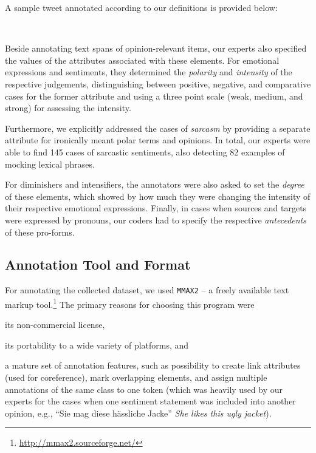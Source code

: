 \noindent{}A sample tweet annotated according to our definitions is
provided below:

{
  \renewcommand{\thesection}{\arabic{section}}
  \begin{example}
    \upshape{}\\[0.8em]
    \noindent{}
  \end{example}
}

Beside annotating text spans of opinion-relevant items, our experts
also specified the values of the attributes associated with these
elements. For emotional expressions and sentiments, they determined
the \emph{polarity} and \emph{intensity} of the respective judgements,
distinguishing between positive, negative, and comparative cases for
the former attribute and using a three point scale (weak, medium, and
strong) for assessing the intensity.

Furthermore, we explicitly addressed the cases of \emph{sarcasm} by
providing a separate attribute for ironically meant polar terms and
opinions.  In total, our experts were able to find 145 cases of
sarcastic sentiments, also detecting 82 examples of mocking lexical
phrases.

For diminishers and intensifiers, the annotators were also asked to
set the \emph{degree} of these elements, which showed by how much they
were changing the intensity of their respective emotional expressions.
Finally, in cases when sources and targets were expressed by pronouns,
our coders had to specify the respective \emph{antecedents} of these
pro-forms.

\subsection{Annotation Tool and Format}\label{subsec:snt:tformat}

For annotating the collected dataset, we used \texttt{MMAX2} -- a
freely available text markup
tool.\footnote{\url{http://mmax2.sourceforge.net/}} The
primary reasons for choosing this program were
\begin{inparaenum}
 \item its non-commercial license,
 \item its portability to a wide variety of platforms, and
 \item a mature set of annotation features, such as possibility to
   create link attributes (used for coreference), mark overlapping
   elements, and assign multiple annotations of the same class to one
   token (which was heavily used by our experts for the cases when one
   sentiment statement was included into another opinion, e.g., ``Sie
   mag diese h\"assliche Jacke'' \emph{She likes this ugly jacket}).
\end{inparaenum}

